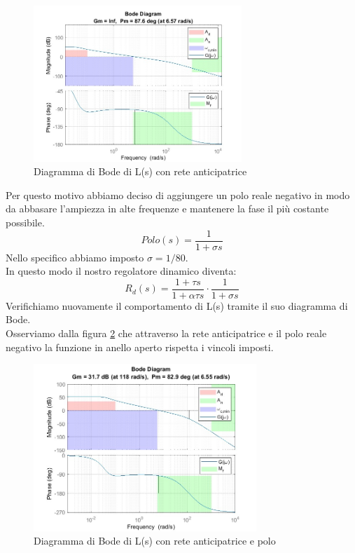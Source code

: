 \documentclass[a4paper, 11pt]{article}
\begin{document}
     \begin{figure}[H]
    \centering
    \includegraphics[width=0.70\textwidth]{immagini/regolatore1.jpg}
    \caption{Diagramma di Bode di L(s) con rete anticipatrice}
    \label{fig:regd1}
\end{figure}
    
    Per questo motivo abbiamo deciso di aggiungere un polo reale negativo in modo da abbasare l'ampiezza in alte frequenze e mantenere la fase il più costante possibile. 
    \\
    \begin{equation*}
        Polo(s)=\dfrac{1}{1+ \sigma s}
    \end{equation*}
Nello specifico abbiamo imposto $\sigma=1/80
    $.\\
    In questo modo il nostro regolatore dinamico diventa:
    \begin{equation*}
        R_d(s)=\dfrac{1+\tau s}{1+\alpha \tau s} \cdot\dfrac{1}{1+ \sigma s}
    \end{equation*}
Verifichiamo nuovamente il comportamento di L(s) tramite il suo diagramma di Bode. \\Osserviamo dalla figura  \ref{fig:regdgiusto} che attraverso la rete anticipatrice e il polo reale negativo la funzione in anello aperto rispetta i vincoli imposti.
    
     \begin{figure}[H]
    \centering
    \includegraphics[width=0.75\textwidth]{immagini/regolatore2.jpg}
    \caption{Diagramma di Bode di L(s) con rete anticipatrice e polo}
    \label{fig:regdgiusto}
\end{figure}
\end{document}
